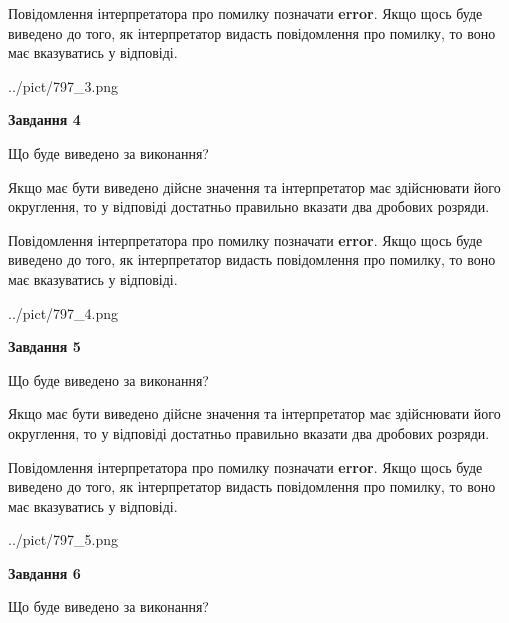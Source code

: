 \documentclass[12pt, ukrainian]{article}
\begin{document}
{\begin {Large}
Повідомлення інтерпретатора про помилку позначати \textbf{error}.
Якщо щось буде виведено до того, як інтерпретатор видасть повідомлення про помилку, 
то воно має вказуватись у відповіді. \par

\begin{center}
	{../pict/797_3.png}
\end{center}
\newpage

{\begin {center}\textbf{Завдання 4}\end {center}}\par
Що буде виведено за виконання? \par

Якщо має бути виведено дійсне значення та інтерпретатор має здійснювати його округлення, 
то у відповіді достатньо правильно вказати два дробових розряди.

Повідомлення інтерпретатора про помилку позначати \textbf{error}.
Якщо щось буде виведено до того, як інтерпретатор видасть повідомлення про помилку, 
то воно має вказуватись у відповіді. \par

\begin{center}
	{../pict/797_4.png}
\end{center}
\newpage

{\begin {center}\textbf{Завдання 5}\end {center}}\par
Що буде виведено за виконання? \par

Якщо має бути виведено дійсне значення та інтерпретатор має здійснювати його округлення, 
то у відповіді достатньо правильно вказати два дробових розряди.

Повідомлення інтерпретатора про помилку позначати \textbf{error}.
Якщо щось буде виведено до того, як інтерпретатор видасть повідомлення про помилку, 
то воно має вказуватись у відповіді. \par

\begin{center}
	{../pict/797_5.png}
\end{center}
\newpage

{\begin {center}\textbf{Завдання 6}\end {center}}\par
Що буде виведено за виконання? \par


\end{Large}}
\end{document}
